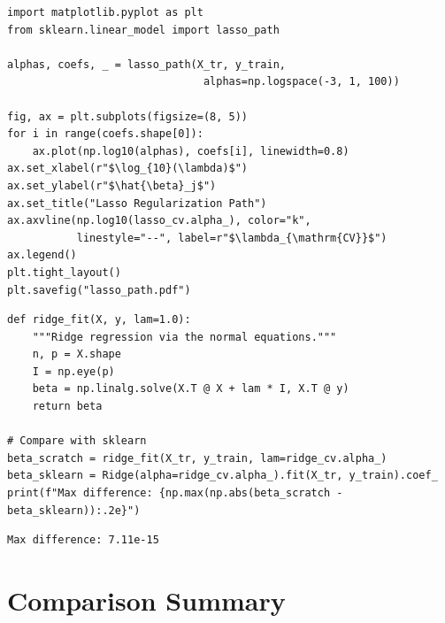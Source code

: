 \begin{codeblock}[title=\textbf{Plotting Regularization Paths}]
\begin{verbatim}
import matplotlib.pyplot as plt
from sklearn.linear_model import lasso_path

alphas, coefs, _ = lasso_path(X_tr, y_train,
                               alphas=np.logspace(-3, 1, 100))

fig, ax = plt.subplots(figsize=(8, 5))
for i in range(coefs.shape[0]):
    ax.plot(np.log10(alphas), coefs[i], linewidth=0.8)
ax.set_xlabel(r"$\log_{10}(\lambda)$")
ax.set_ylabel(r"$\hat{\beta}_j$")
ax.set_title("Lasso Regularization Path")
ax.axvline(np.log10(lasso_cv.alpha_), color="k",
           linestyle="--", label=r"$\lambda_{\mathrm{CV}}$")
ax.legend()
plt.tight_layout()
plt.savefig("lasso_path.pdf")
\end{verbatim}
\end{codeblock}

\begin{codeblock}[title=\textbf{Ridge from Scratch}]
\begin{verbatim}
def ridge_fit(X, y, lam=1.0):
    """Ridge regression via the normal equations."""
    n, p = X.shape
    I = np.eye(p)
    beta = np.linalg.solve(X.T @ X + lam * I, X.T @ y)
    return beta

# Compare with sklearn
beta_scratch = ridge_fit(X_tr, y_train, lam=ridge_cv.alpha_)
beta_sklearn = Ridge(alpha=ridge_cv.alpha_).fit(X_tr, y_train).coef_
print(f"Max difference: {np.max(np.abs(beta_scratch - beta_sklearn)):.2e}")
\end{verbatim}
\end{codeblock}

\begin{codeoutput}
\begin{verbatim}
Max difference: 7.11e-15
\end{verbatim}
\end{codeoutput}

\section{Comparison Summary}

